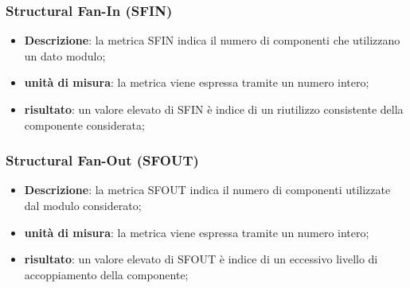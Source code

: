 		\subsubsection*{Structural Fan-In (SFIN)}
		\begin{itemize}
			\item{\textbf{Descrizione}}: la metrica SFIN indica il numero di componenti che utilizzano un dato modulo; 
			\item{\textbf{unità di misura}}: la metrica viene espressa tramite un numero intero; 
			\item{\textbf{risultato}}: un valore elevato di SFIN è indice di un riutilizzo consistente della componente considerata; 
		\end{itemize}
	
		\subsubsection*{Structural Fan-Out (SFOUT)}
		\begin{itemize}
			\item{\textbf{Descrizione}}: la metrica SFOUT indica il numero di componenti utilizzate dal modulo considerato; 
			\item{\textbf{unità di misura}}: la metrica viene espressa tramite un numero intero;  
			\item{\textbf{risultato}}: un valore elevato di SFOUT è indice di un eccessivo livello di accoppiamento della componente; 
		\end{itemize}
		
